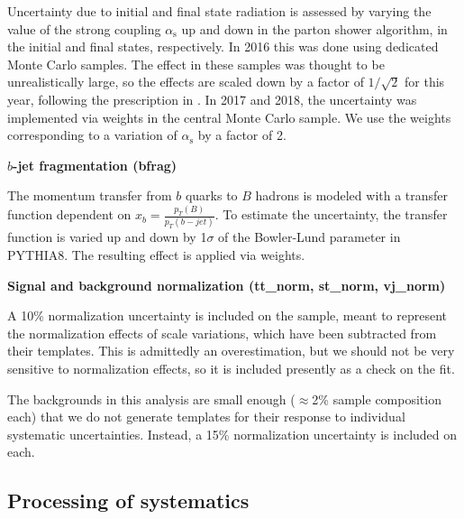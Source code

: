 Uncertainty due to initial and final state radiation is assessed by varying the value of the strong coupling $\alpha_\mathrm{s}$ up and down in the parton shower algorithm, in the initial and final states, respectively. In 2016 this was done using dedicated Monte Carlo samples. The effect in these samples was thought to be unrealistically large, so the effects are scaled down by a factor of $1/\sqrt{2}$ for this year, following the prescription in \cite{Skands:2014pea}. In 2017 and 2018, the uncertainty was implemented via weights in the central Monte Carlo sample. We use the weights corresponding to a variation of $\alpha_\mathrm{s}$ by a factor of 2.
\par \noindent
\textbf{$b$-jet fragmentation (bfrag)} 

The momentum transfer from $b$ quarks to $B$ hadrons is modeled with a transfer function dependent on $x_b=\frac{p_T(B)}{p_T(b-jet)}$. To estimate the uncertainty, the transfer function is varied up and down by 1$\sigma$ of the Bowler-Lund parameter in PYTHIA8. The resulting effect is applied via weights.
\par \noindent
\textbf{Signal and background normalization (tt\_norm, st\_norm, vj\_norm)} 

A 10\% normalization uncertainty is included on the \ttbar sample, meant to represent the normalization effects of scale variations, which have been subtracted from their templates. This is admittedly an overestimation, but we should not be very sensitive to normalization effects, so it is included presently as a check on the fit.

The backgrounds in this analysis are small enough ($\approx$2\% sample composition each) that we do not generate templates for their response to individual systematic uncertainties. Instead, a 15\% normalization uncertainty is included on each.


\subsection{Processing of systematics}

